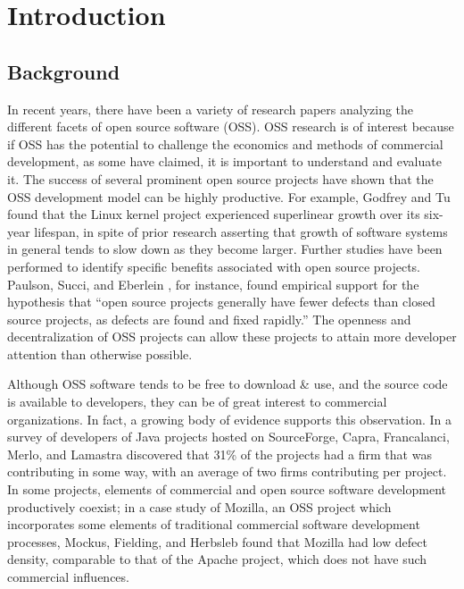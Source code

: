 \chapter{Introduction}
\section{Background}
In recent years, there have been a variety of research papers analyzing the different facets of open source software (OSS). OSS research is of interest because if OSS has the potential to challenge the economics and methods of commercial development, 
as some have claimed, it is important to understand and evaluate it\cite{mockus2002two}. The success of several prominent open source projects have shown that the OSS development model can be highly productive. For example, Godfrey and Tu \cite{godfrey2000evolution} found that the Linux kernel project experienced superlinear growth over its six-year lifespan, in spite of prior research asserting that growth of software systems in general tends to slow down as they become larger. Further studies have been performed to identify specific benefits associated with open source projects. Paulson, Succi, and Eberlein \cite{paulson2004empirical}, for instance, found empirical support for the hypothesis that ``open source projects generally have fewer defects than closed source projects, as defects are found and fixed rapidly.'' The openness and decentralization of OSS projects can allow these projects to attain more developer attention than otherwise possible.

Although OSS software tends to be free to download \& use, and the source code
is available to developers, 
 they can be of great interest to
 commercial organizations. In fact, a growing body of evidence supports this observation. %
  In a survey of developers of Java projects hosted on SourceForge, Capra, Francalanci, Merlo, and Lamastra discovered that 31\% of the projects had a firm that was contributing in some way, with an average of two firms contributing per project\cite{capra2009survey}. In some projects, elements of commercial and open source software development productively coexist; in a case study of Mozilla, an OSS project which incorporates some elements of traditional commercial software development processes, Mockus, Fielding, and Herbsleb \cite{mockus2002two} found that Mozilla had low defect density, comparable to that of the Apache project, which does not have such commercial influences.

